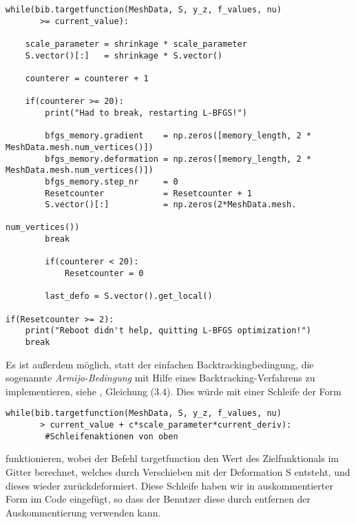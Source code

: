 \begin{lstlisting}
while(bib.targetfunction(MeshData, S, y_z, f_values, nu)
       >= current_value):
	
	scale_parameter = shrinkage * scale_parameter
    S.vector()[:]   = shrinkage * S.vector()

    counterer = counterer + 1

	if(counterer >= 20):
    	print("Had to break, restarting L-BFGS!")

        bfgs_memory.gradient    = np.zeros([memory_length, 2 * 																     MeshData.mesh.num_vertices()])
        bfgs_memory.deformation = np.zeros([memory_length, 2 * 																   MeshData.mesh.num_vertices()])
        bfgs_memory.step_nr     = 0
        Resetcounter            = Resetcounter + 1
        S.vector()[:]           = np.zeros(2*MeshData.mesh.
        											           num_vertices())
        break

        if(counterer < 20):
            Resetcounter = 0

        last_defo = S.vector().get_local()

if(Resetcounter >= 2):
    print("Reboot didn't help, quitting L-BFGS optimization!")
    break
\end{lstlisting}

Es ist außerdem möglich, statt der einfachen Backtrackingbedingung, die sogenannte \textit{Armijo-Bedingung} mit Hilfe eines Backtracking-Verfahrens zu implementieren, siehe \cite{Nocedal}, Gleichung (3.4).
Dies würde mit einer Schleife der Form
\begin{lstlisting}
while(bib.targetfunction(MeshData, S, y_z, f_values, nu)
       > current_value + c*scale_parameter*current_deriv):
		#Schleifenaktionen von oben
\end{lstlisting}
funktionieren, wobei der Befehl \textsf{targetfunction} den Wert des Zielfunktionals im Gitter berechnet, welches durch Verschieben mit der Deformation \textsf{S} entsteht, und dieses wieder zurückdeformiert. Diese Schleife haben wir in auskommentierter Form im Code eingefügt, so dass der Benutzer diese durch entfernen der Auskommentierung verwenden kann.

